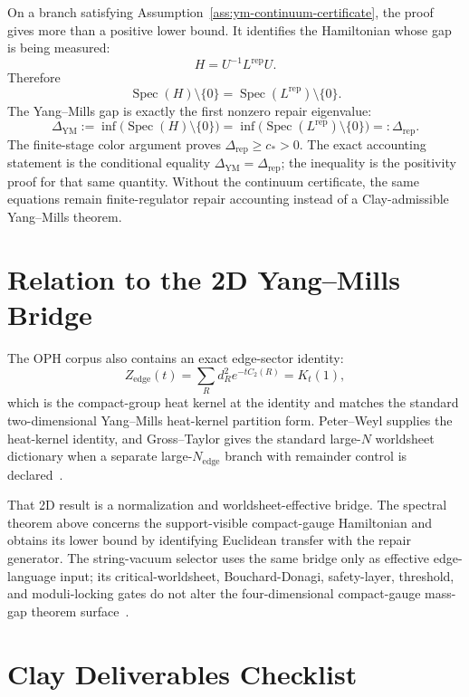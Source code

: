\documentclass[11pt]{article}
\numberwithin{equation}{section}
\theoremstyle{remark}
\newcommand{\YM}{\mathrm{YM}}
\begin{document}
On a branch satisfying Assumption~\ref{ass:ym-continuum-certificate}, the proof gives more than a
positive lower bound. It identifies the Hamiltonian whose gap is being measured:
\[
H=U^{-1}L^{\mathrm{rep}}U.
\]
Therefore
\[
\operatorname{Spec}(H)\setminus\{0\}
=
\operatorname{Spec}(L^{\mathrm{rep}})\setminus\{0\}.
\]
The Yang--Mills gap is exactly the first nonzero repair eigenvalue:
\[
\Delta_{\YM}
:=
\inf\bigl(\operatorname{Spec}(H)\setminus\{0\}\bigr)
=
\inf\bigl(\operatorname{Spec}(L^{\mathrm{rep}})\setminus\{0\}\bigr)
=:
\Delta_{\mathrm{rep}}.
\]
The finite-stage color argument proves \(\Delta_{\mathrm{rep}}\ge c_*>0\). The exact accounting
statement is the conditional equality \(\Delta_{\YM}=\Delta_{\mathrm{rep}}\); the inequality is the
positivity proof for that same quantity. Without the continuum certificate, the same equations
remain finite-regulator repair accounting instead of a Clay-admissible Yang--Mills theorem.

\section{Relation to the 2D Yang--Mills Bridge}

The OPH corpus also contains an exact edge-sector identity:
\[
Z_{\mathrm{edge}}(t)=\sum_R d_R^2e^{-tC_2(R)}=K_t(1),
\]
which is the compact-group heat kernel at the identity and matches the standard
two-dimensional Yang--Mills heat-kernel partition form. Peter--Weyl supplies the heat-kernel
identity, and Gross--Taylor gives the standard large-\(N\) worldsheet dictionary when a separate
large-\(N_{\mathrm{edge}}\) branch with remainder control is declared~\cite{peter-weyl,gross-taylor}.

That 2D result is a normalization and worldsheet-effective bridge. The spectral theorem above
concerns the support-visible compact-gauge Hamiltonian and obtains its lower bound by identifying
Euclidean transfer with the repair generator.
The string-vacuum selector uses the same bridge only as effective edge-language input; its
critical-worldsheet, Bouchard-Donagi, safety-layer, threshold, and moduli-locking gates do not alter
the four-dimensional compact-gauge mass-gap theorem surface~\cite{ophstringselector}.

\section{Clay Deliverables Checklist}
\end{document}
